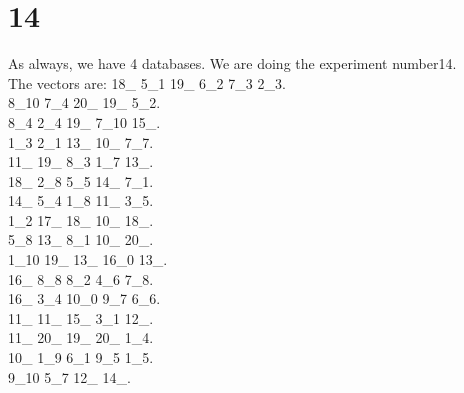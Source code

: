 \chapter{14}
\indent As always, we have 4 databases. We are doing the experiment number14.\\
The vectors are:
18\_ 5\_1 19\_ 6\_2 7\_3 2\_3.\\8\_10 7\_4 20\_ 19\_ 5\_2.\\8\_4 2\_4 19\_ 7\_10 15\_.\\1\_3 2\_1 13\_ 10\_ 7\_7.\\11\_ 19\_ 8\_3 1\_7 13\_.\\18\_ 2\_8 5\_5 14\_ 7\_1.\\14\_ 5\_4 1\_8 11\_ 3\_5.\\1\_2 17\_ 18\_ 10\_ 18\_.\\5\_8 13\_ 8\_1 10\_ 20\_.\\1\_10 19\_ 13\_ 16\_0 13\_.\\16\_ 8\_8 8\_2 4\_6 7\_8.\\16\_ 3\_4 10\_0 9\_7 6\_6.\\11\_ 11\_ 15\_ 3\_1 12\_.\\11\_ 20\_ 19\_ 20\_ 1\_4.\\10\_ 1\_9 6\_1 9\_5 1\_5.\\9\_10 5\_7 12\_ 14\_.\\
